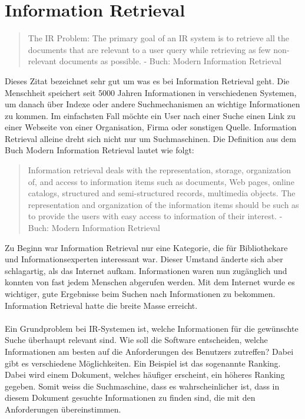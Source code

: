 \documentclass[12pt,a4paper,ngerman]{report}
\begin{document}
\section*{Information Retrieval}
\begin{quote}
The IR Problem: The primary goal of an IR system is to retrieve all the documents that are relevant to a user query while retrieving as few non-relevant documents as possible. - Buch: Modern Information Retrieval
\end{quote}
Dieses Zitat bezeichnet sehr gut um was es bei Information Retrieval geht. Die Menschheit speichert seit 5000 Jahren Informationen in verschiedenen Systemen, um danach über Indexe oder andere Suchmechanismen an wichtige Informationen zu kommen. Im einfachsten Fall möchte ein User nach einer Suche einen Link zu einer Webseite von einer Organisation, Firma oder sonstigen Quelle. Information Retrieval alleine dreht sich nicht nur um Suchmaschinen. Die Definition aus dem Buch Modern Information Retrieval lautet wie folgt:
\begin{quote}
Information retrieval deals with the representation, storage, organization of, and access to information items such as documents, Web pages, online catalogs, structured and semi-structured records, multimedia objects. The representation and organization of the information items should be such as to provide the users with easy access to information of their interest. - Buch: Modern Information Retrieval
\end{quote}
Zu Beginn war Information Retrieval nur eine Kategorie, die für Bibliothekare und Informationsexperten interessant war. Dieser Umstand änderte sich aber schlagartig, als das Internet aufkam. Informationen waren nun zugänglich und konnten von fast jedem Menschen abgerufen werden. Mit dem Internet wurde es wichtiger, gute Ergebnisse beim Suchen nach Informationen zu bekommen. Information Retrieval hatte die breite Masse erreicht.\\
\\
Ein Grundproblem bei IR-Systemen ist, welche Informationen für die gewünschte Suche überhaupt relevant sind. Wie soll die Software entscheiden, welche Informationen am besten auf die Anforderungen des Benutzers zutreffen? Dabei gibt es verschiedene Möglichkeiten. Ein Beispiel ist das sogenannte Ranking. Dabei wird einem Dokument, welches häufiger erscheint, ein höheres Ranking gegeben. Somit weiss die Suchmaschine, dass es wahrscheinlicher ist, dass in diesem Dokument gesuchte Informationen zu finden sind, die mit den Anforderungen übereinstimmen.\\
\end{document}
